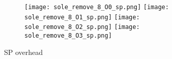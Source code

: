 \documentclass[11pt]{article}
\begin{document}
    \begin{figure}[ht]
        \begin{subfigure}{\linewidth}
            \texttt{[image: sole\_remove\_8\_O0\_sp.png]}
            \texttt{[image: sole\_remove\_8\_O1\_sp.png]}
            \texttt{[image: sole\_remove\_8\_O2\_sp.png]}
            \texttt{[image: sole\_remove\_8\_O3\_sp.png]}
        \end{subfigure}\par\medskip
        \caption{SP overhead}
        \label{fig:sole_figs_8}
    \end{figure}
\end{document}
